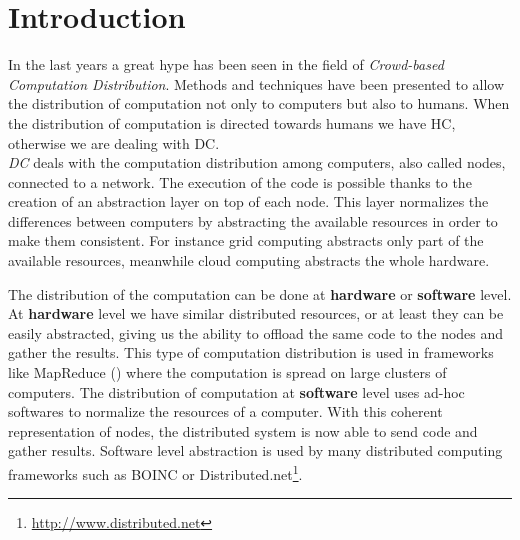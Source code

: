 \cleardoublepage
\chapter{Introduction}
\label{intro}




In the last years a great hype has been seen in the field of \emph{Crowd-based
Computation Distribution}. Methods and techniques have been presented to allow the
distribution of computation not only to computers but also to humans. When the
distribution of computation is directed towards humans we have \ac{HC},
otherwise we are dealing with \ac{DC}.\\


\emph{\acl{DC}} deals with the computation distribution among computers, also
called nodes, connected to a network. The execution of the code is possible thanks
to the creation of an abstraction layer on top of each node. This layer normalizes
the differences between computers by abstracting the available resources in order
to make them consistent. For instance grid computing abstracts only part of the
available resources, meanwhile cloud computing abstracts the whole hardware.

The distribution of the computation can be done at \textbf{hardware} or
\textbf{software} level.
At \textbf{hardware} level we have similar distributed resources, or at least
they can be easily abstracted, giving us the ability to offload the same code to the
nodes and gather the results. This type of computation distribution is used in
frameworks like MapReduce (\cite{dean2008mapreduce}) where the
computation is spread on large clusters of computers.
The distribution of computation at \textbf{software} level uses ad-hoc softwares
to normalize the resources of a computer. With this coherent representation of
nodes, the distributed system is now able to send code and gather results.
Software level abstraction is used by many distributed computing frameworks such
as \ac{BOINC} or Distributed.net\footnote{\url{http://www.distributed.net}}.

